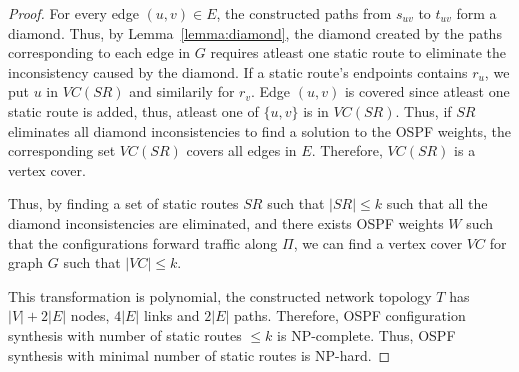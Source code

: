 \begin{proof}
For every edge $(u,v) \in E$, the constructed paths from 
$s_{uv}$ to $t_{uv}$ form a diamond. Thus, by Lemma~\ref{lemma:diamond}, 
the diamond created by the paths corresponding to each edge in $G$ 
requires atleast one static route to eliminate
the inconsistency caused by the diamond. If a static route's endpoints
contains $r_u$, we put $u$ in $VC(SR)$ and similarily for $r_v$. 
Edge $(u,v)$ is covered since atleast one static route is added,
thus, atleast one of $\{u,v\}$ is in $VC(SR)$.  
Thus, if $SR$ eliminates all diamond inconsistencies
to find a solution to the OSPF weights, the corresponding set
$VC(SR)$ covers all edges in $E$. Therefore, $VC(SR)$ is a vertex
cover. 

Thus, by finding a set of static routes $SR$ such that $|SR| \leq k$
such that all the diamond inconsistencies are eliminated, and there
exists OSPF weights $W$ such that the configurations forward traffic
along $\Pi$, we can find a vertex cover $VC$ for graph $G$ such that
$|VC| \leq k$. 

This transformation is polynomial, the constructed 
network topology $T$ has $|V| + 2|E|$ nodes, 
$4|E|$ links and $2|E|$ paths. Therefore, OSPF
configuration synthesis with number of static routes $\leq k$ is
NP-complete. Thus, OSPF synthesis with minimal number of 
static routes is NP-hard. 
\end{proof}
